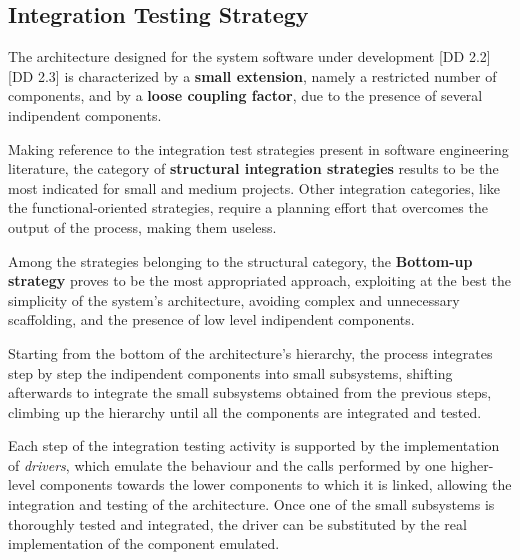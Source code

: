\subsection{Integration Testing Strategy}
\label{sec:integration-testing-strategy}

The architecture designed for the system software under development [DD 2.2] [DD 2.3] is characterized by a \textbf{small extension}, namely a restricted number of components, and by a \textbf{loose coupling factor}, due to the presence of several indipendent components.

Making reference to the integration test strategies present in software engineering literature, the category of \textbf{structural integration strategies} results to be the most indicated for small and medium projects.
Other integration categories, like the functional-oriented strategies, require a planning effort that overcomes the output of the process, making them useless.

Among the strategies belonging to the structural category, the \textbf{Bottom-up strategy} proves to be the most appropriated approach, exploiting at the best the simplicity of the system's architecture, avoiding complex and unnecessary scaffolding, and the presence of low level indipendent components.

Starting from the bottom of the architecture's hierarchy, the process integrates step by step the indipendent components into small subsystems, shifting afterwards to integrate the small subsystems obtained from the previous steps, climbing up the hierarchy until all the components are integrated and tested.

Each step of the integration testing activity is supported by the implementation of \textit{drivers}, which emulate the behaviour and the calls performed by one higher-level components towards the lower components to which it is linked, allowing the integration and testing of the architecture.
Once one of the small subsystems is thoroughly tested and integrated, the driver can be substituted by the real implementation of the component emulated.
